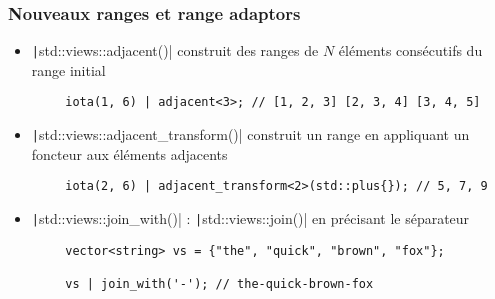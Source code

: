\documentclass[C++.tex]{subfiles}
\begin{document}
\begin{frame}[fragile]
	\frametitle{Nouveaux ranges et range adaptors}

	\begin{itemize}
		\item \texttt|std::views::adjacent()| construit des ranges de $N$ éléments consécutifs du range initial
	\end{itemize}

	\begin{verbatim}
		iota(1, 6) | adjacent<3>; // [1, 2, 3] [2, 3, 4] [3, 4, 5]
	\end{verbatim}

	\begin{itemize}
		\item \texttt|std::views::adjacent_transform()| construit un range en appliquant un foncteur aux éléments adjacents
	\end{itemize}

	\begin{verbatim}
		iota(2, 6) | adjacent_transform<2>(std::plus{}); // 5, 7, 9
	\end{verbatim}

	\begin{itemize}
		\item \texttt|std::views::join_with()| : \texttt|std::views::join()| en précisant le séparateur
	\end{itemize}

	\begin{verbatim}
		vector<string> vs = {"the", "quick", "brown", "fox"};

		vs | join_with('-'); // the-quick-brown-fox
	\end{verbatim}



\end{frame}
\end{document}
